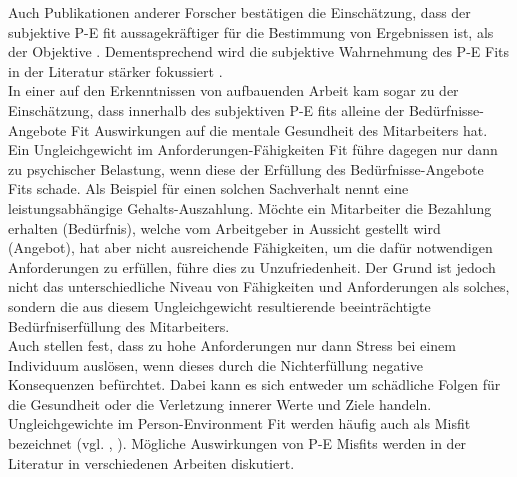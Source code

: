 Auch Publikationen anderer Forscher bestätigen die Einschätzung, dass der subjektive P-E fit aussagekräftiger für die Bestimmung von Ergebnissen ist, als der Objektive \cite[S. 3]{carless:2005}. Dementsprechend wird die subjektive Wahrnehmung des P-E Fits in der Literatur stärker fokussiert \cite[S. 8]{caplan:1987}\cite[S. 9]{caplan:1993}\cite[S. 16]{choi:2004}.\\
In einer auf den Erkenntnissen von \textcite{copingAndAdaption:1974} aufbauenden Arbeit kam \textcite{harrison:1978} sogar zu der Einschätzung, dass innerhalb des subjektiven P-E fits alleine der Bedürfnisse-Angebote Fit Auswirkungen auf die mentale Gesundheit des Mitarbeiters hat. Ein Ungleichgewicht im Anforderungen-Fähigkeiten Fit führe dagegen nur dann zu psychischer Belastung, wenn diese der Erfüllung des Bedürfnisse-Angebote Fits schade. Als Beispiel für einen solchen Sachverhalt nennt \textcite{harrison:1978} eine leistungsabhängige Gehalts-Auszahlung. Möchte ein Mitarbeiter die Bezahlung erhalten (Bedürfnis), welche vom Arbeitgeber in Aussicht gestellt wird (Angebot), hat aber nicht ausreichende Fähigkeiten, um die dafür notwendigen Anforderungen zu erfüllen, führe dies zu Unzufriedenheit. Der Grund ist jedoch nicht das unterschiedliche Niveau von Fähigkeiten und Anforderungen als solches, sondern die aus diesem Ungleichgewicht resultierende beeinträchtigte Bedürfniserfüllung des Mitarbeiters.\\
Auch \textcite[S. 1ff.]{lazarus:1978} stellen fest, dass zu hohe Anforderungen nur dann Stress bei einem Individuum auslösen, wenn dieses durch die Nichterfüllung negative Konsequenzen befürchtet. Dabei kann es sich entweder um schädliche Folgen für die Gesundheit oder die Verletzung innerer Werte und Ziele handeln.\\
Ungleichgewichte im Person-Environment Fit werden häufig auch als Misfit bezeichnet (vgl. \cite[S. 2]{edwards:2004}, \cite[S. 4]{kristof:1996}). Mögliche Auswirkungen von P-E Misfits werden in der Literatur in verschiedenen Arbeiten diskutiert.

